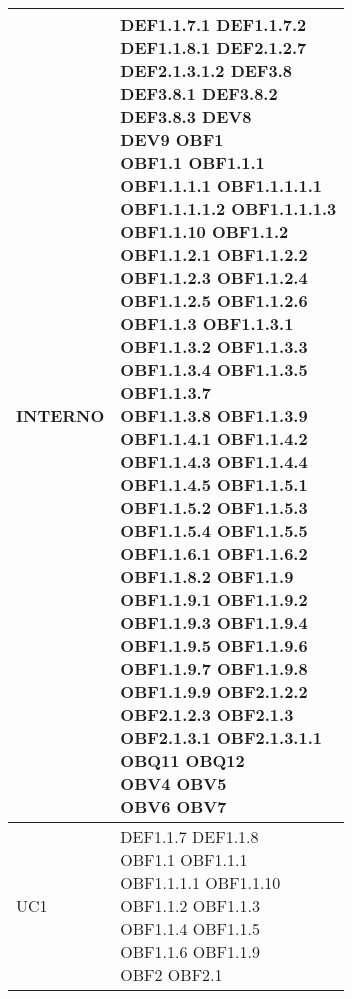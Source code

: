 \documentclass{scalatekids-article}
\begin{document}
\begin{longtable}[H]{|p{5.5cm}|p{5.5cm}|}
INTERNO & \multiLineCell[t]{DEF1.1.7.1 DEF1.1.7.2\\DEF1.1.8.1 DEF2.1.2.7\\DEF2.1.3.1.2 DEF3.8\\DEF3.8.1 DEF3.8.2\\DEF3.8.3 DEV8\\DEV9 OBF1\\OBF1.1 OBF1.1.1\\OBF1.1.1.1 OBF1.1.1.1.1\\OBF1.1.1.1.2 OBF1.1.1.1.3\\OBF1.1.10 OBF1.1.2\\OBF1.1.2.1 OBF1.1.2.2\\OBF1.1.2.3 OBF1.1.2.4\\OBF1.1.2.5 OBF1.1.2.6\\OBF1.1.3 OBF1.1.3.1\\OBF1.1.3.2 OBF1.1.3.3\\OBF1.1.3.4 OBF1.1.3.5\\OBF1.1.3.7\\OBF1.1.3.8 OBF1.1.3.9\\OBF1.1.4.1 OBF1.1.4.2\\OBF1.1.4.3 OBF1.1.4.4\\OBF1.1.4.5 OBF1.1.5.1\\OBF1.1.5.2 OBF1.1.5.3\\OBF1.1.5.4 OBF1.1.5.5\\OBF1.1.6.1 OBF1.1.6.2\\OBF1.1.8.2 OBF1.1.9\\OBF1.1.9.1 OBF1.1.9.2\\OBF1.1.9.3 OBF1.1.9.4\\OBF1.1.9.5 OBF1.1.9.6\\OBF1.1.9.7 OBF1.1.9.8\\OBF1.1.9.9 OBF2.1.2.2\\OBF2.1.2.3 OBF2.1.3\\OBF2.1.3.1 OBF2.1.3.1.1\\OBQ11 OBQ12\\OBV4 OBV5\\OBV6 OBV7\\}\\
\hline
UC1 & \multiLineCell[t]{DEF1.1.7 DEF1.1.8\\OBF1.1 OBF1.1.1\\OBF1.1.1.1 OBF1.1.10\\OBF1.1.2 OBF1.1.3\\OBF1.1.4 OBF1.1.5\\OBF1.1.6 OBF1.1.9\\OBF2 OBF2.1\\}\\

\end{longtable}
\end{document}
